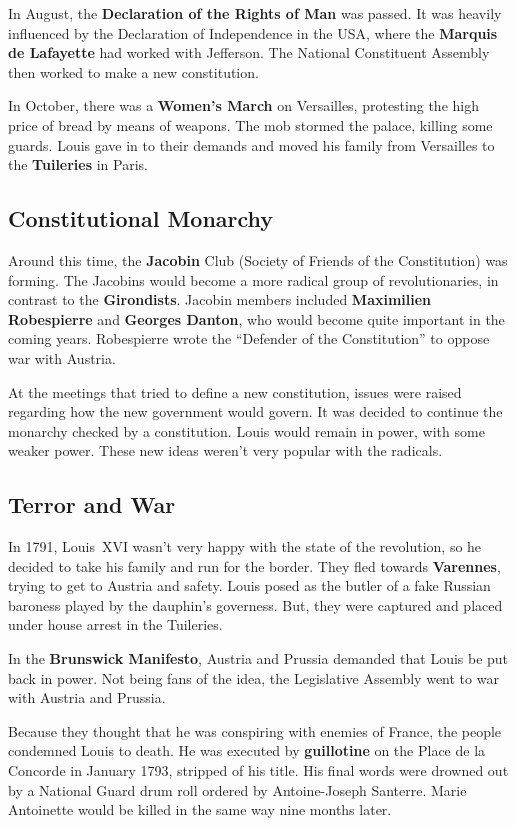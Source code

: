 In August, the \textbf{Declaration of the Rights of Man} was passed.
It was heavily influenced by the Declaration of Independence in the USA,
where the \textbf{Marquis de Lafayette} had worked with Jefferson.
The National Constituent Assembly then worked to make a new constitution.

In October, there was a \textbf{Women's March} on Versailles,
protesting the high price of bread by means of weapons.
The mob stormed the palace, killing some guards.
Louis gave in to their demands and moved his family from Versailles to the \textbf{Tuileries} in Paris.

\subsection*{Constitutional Monarchy}

Around this time, the \textbf{Jacobin} Club (Society of Friends of the Constitution) was forming.
The Jacobins would become a more radical group of revolutionaries, in contrast to the \textbf{Girondists}.
Jacobin members included \textbf{Maximilien Robespierre} and \textbf{Georges Danton},
who would become quite important in the coming years.
Robespierre wrote the ``Defender of the Constitution'' to oppose war with Austria.

At the meetings that tried to define a new constitution,
issues were raised regarding how the new government would govern.
It was decided to continue the monarchy checked by a constitution.
Louis would remain in power, with some weaker power.
These new ideas weren't very popular with the radicals.

\subsection*{Terror and War}

In 1791, Louis~XVI wasn't very happy with the state of the revolution,
so he decided to take his family and run for the border.
They fled towards \textbf{Varennes}, trying to get to Austria and safety.
Louis posed as the butler of a fake Russian baroness played by the dauphin's governess.
But, they were captured and placed under house arrest in the Tuileries.

In the \textbf{Brunswick Manifesto}, Austria and Prussia demanded that Louis be put back in power.
Not being fans of the idea, the Legislative Assembly went to war with Austria and Prussia.

Because they thought that he was conspiring with enemies of France, the people condemned Louis to death.
He was executed by \textbf{guillotine} on the Place de la Concorde in January 1793, stripped of his title.
His final words were drowned out by a National Guard drum roll ordered by Antoine-Joseph Santerre.
Marie Antoinette would be killed in the same way nine months later.


